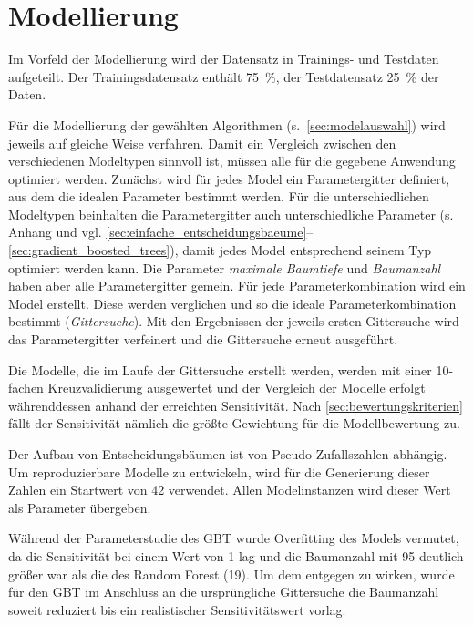 \section{Modellierung}
\label{sec:modellierung}
Im Vorfeld der Modellierung wird der Datensatz in Trainings- und Testdaten aufgeteilt. Der Trainingsdatensatz enthält \SI{75}{\percent}, der Testdatensatz \SI{25}{\percent} der Daten. 

Für die Modellierung der gewählten Algorithmen (s.~\cref{sec:modelauswahl}) wird jeweils auf gleiche Weise verfahren. Damit ein Vergleich zwischen den verschiedenen Modeltypen sinnvoll ist, müssen alle für die gegebene Anwendung optimiert werden. Zunächst wird für jedes Model ein Parametergitter definiert, aus dem die idealen Parameter bestimmt werden. Für die unterschiedlichen Modeltypen beinhalten die Parametergitter auch unterschiedliche Parameter (s. Anhang und vgl. \cref{sec:einfache_entscheidungsbaeume}--\cref{sec:gradient_boosted_trees}), damit jedes Model entsprechend seinem Typ optimiert werden kann. Die Parameter \textit{maximale Baumtiefe} und \textit{Baumanzahl} haben aber alle Parametergitter gemein. Für jede Parameterkombination wird ein Model erstellt. Diese werden verglichen und so die ideale Parameterkombination bestimmt (\textit{Gittersuche}). Mit den Ergebnissen der jeweils ersten Gittersuche wird das Parametergitter verfeinert und die Gittersuche erneut ausgeführt.

Die Modelle, die im Laufe der Gittersuche erstellt werden, werden mit einer 10-fachen Kreuzvalidierung ausgewertet und der Vergleich der Modelle erfolgt währenddessen anhand der erreichten Sensitivität. Nach \cref{sec:bewertungskriterien} fällt der Sensitivität nämlich die größte Gewichtung für die Modellbewertung zu.

Der Aufbau von Entscheidungsbäumen ist von Pseudo-Zufallszahlen abhängig. Um reproduzierbare Modelle zu entwickeln, wird für die Generierung dieser Zahlen ein Startwert von \num{42} verwendet. Allen Modelinstanzen wird dieser Wert als Parameter übergeben.

Während der Parameterstudie des GBT wurde Overfitting des Models vermutet, da die Sensitivität bei einem Wert von \num{1} lag und die Baumanzahl mit \num{95} deutlich größer war als die des Random Forest (19). Um dem entgegen zu wirken, wurde für den GBT im Anschluss an die ursprüngliche Gittersuche die Baumanzahl soweit reduziert bis ein realistischer Sensitivitätswert vorlag.
